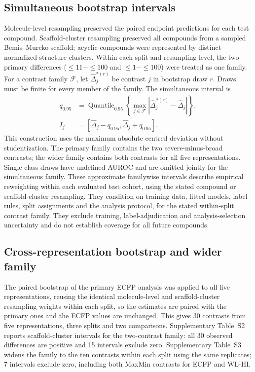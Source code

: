 \documentclass[10pt]{article}
\begin{document}
\subsection*{Simultaneous bootstrap intervals}
Molecule-level resampling preserved the paired endpoint predictions for each test compound. Scaffold-cluster resampling preserved all compounds from a sampled Bemis--Murcko scaffold; acyclic compounds were represented by distinct normalized-structure clusters. Within each split and resampling level, the two primary differences (\(\leq11-\leq100\) and \(\leq1-\leq100\)) were treated as one family. For a contrast family \(\mathcal F\), let \(\widehat\Delta_j^{*(r)}\) be contrast \(j\) in bootstrap draw \(r\). Draws must be finite for every member of the family. The simultaneous interval is
\begin{equation}
\begin{aligned}
q_{0.95}&=\operatorname{Quantile}_{0.95}
\left\{\max_{j\in\mathcal F}
\left|\widehat\Delta_j^{*(r)}-\widehat\Delta_j\right|\right\},\\
I_j&=[\widehat\Delta_j-q_{0.95},\widehat\Delta_j+q_{0.95}].
\end{aligned}
\label{eq:si-simultaneous}
\end{equation}
This construction uses the maximum absolute centred deviation without studentization. The primary family contains the two severe-minus-broad contrasts; the wider family contains both contrasts for all five representations. Single-class draws have undefined AUROC and are omitted jointly for the simultaneous family. These approximate familywise intervals describe empirical reweighting within each evaluated test cohort, using the stated compound or scaffold-cluster resampling. They condition on training data, fitted models, label rules, split assignments and the analysis protocol, for the stated within-split contrast family. They exclude training, label-adjudication and analysis-selection uncertainty and do not establish coverage for all future compounds.

\subsection*{Cross-representation bootstrap and wider family}
The paired bootstrap of the primary ECFP analysis was applied to all five representations, reusing the identical molecule-level and scaffold-cluster resampling weights within each split, so the estimates are paired with the primary ones and the ECFP values are unchanged. This gives 30 contrasts from five representations, three splits and two comparisons. Supplementary Table~S2 reports scaffold-cluster intervals for the two-contrast family: all 30 observed differences are positive and 15 intervals exclude zero. Supplementary Table~S3 widens the family to the ten contrasts within each split using the same replicates; 7 intervals exclude zero, including both MaxMin contrasts for ECFP and WL-HI.
\end{document}
